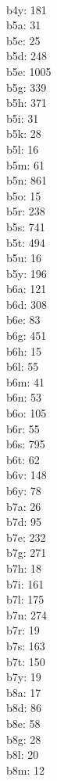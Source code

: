 \begin{multicols}{8}
  \\b4y: 181
  \\b5a: 31
  \\b5c: 25
  \\b5d: 248
  \\b5e: 1005
  \\b5g: 339
  \\b5h: 371
  \\b5i: 31
  \\b5k: 28
  \\b5l: 16
  \\b5m: 61
  \\b5n: 861
  \\b5o: 15
  \\b5r: 238
  \\b5s: 741
  \\b5t: 494
  \\b5u: 16
  \\b5y: 196
  \\b6a: 121
  \\b6d: 308
  \\b6e: 83
  \\b6g: 451
  \\b6h: 15
  \\b6l: 55
  \\b6m: 41
  \\b6n: 53
  \\b6o: 105
  \\b6r: 55
  \\b6s: 795
  \\b6t: 62
  \\b6v: 148
  \\b6y: 78
  \\b7a: 26
  \\b7d: 95
  \\b7e: 232
  \\b7g: 271
  \\b7h: 18
  \\b7i: 161
  \\b7l: 175
  \\b7n: 274
  \\b7r: 19
  \\b7s: 163
  \\b7t: 150
  \\b7y: 19
  \\b8a: 17
  \\b8d: 86
  \\b8e: 58
  \\b8g: 28
  \\b8l: 20
  \\b8m: 12

\end{multicols}
